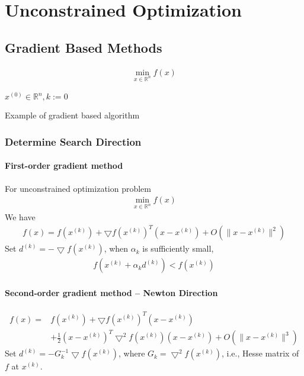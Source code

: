\chapter{Unconstrained Optimization}
\vspace{1em}
\section{Gradient Based Methods}

\begin{align}
    \min_{x \in \mathbb{R}^n} f(x)
\end{align}
\begin{algorithm}[H]
    \SetAlgoLined
     $x^{(0)} \in \mathbb{R}^n, k:= 0$\;
     \caption{Example of gradient based algorithm}
\end{algorithm}
\subsection{Determine Search Direction}
\subsubsection{First-order gradient method}
\par
For unconstrained optimization problem 
\begin{align}
    \min_{x \in \mathbb{R}^n} f(x)
\end{align}
We have
\begin{align}
    f(x) = f(x^{(k)}) + \bigtriangledown f(x^{(k)})^T(x - x^{(k)})
    + O(\parallel x - x^{(k)} \parallel^2)
\end{align}
Set $d^{(k)} = - \bigtriangledown f(x^{(k)})$,
when $\alpha_k$ is sufficiently small,
\begin{align}
    f(x^{(k)} + \alpha_k d^{(k)}) < f(x^{(k)})
\end{align}

\subsubsection{Second-order gradient method -- Newton Direction}
\par
\begin{align}
    f(x) = &f(x^{(k)}) + \bigtriangledown f(x^{(k)})^T(x - x^{(k)}) \\
    &+ \frac{1}{2} (x - x^{(k)})^T \bigtriangledown^2 f(x^{(k)}) (x - x^{(k)})
    + O(\parallel x - x^{(k)} \parallel^3)
\end{align}
Set $d^{(k)} = -G_k^{-1} \bigtriangledown f(x^{(k)})$,
 where $G_k = \bigtriangledown^2 f(x^{(k)})$,
 i.e., Hesse matrix of $f$ at $x^{(k)}$.
